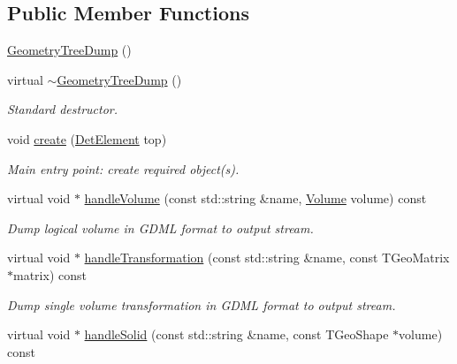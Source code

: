 \subsection*{Public Member Functions}
\begin{DoxyCompactItemize}
\item 
\hyperlink{class_d_d4hep_1_1_geometry_1_1_geometry_tree_dump_a47f8f93072e4f019169b6f7853c4cb77}{GeometryTreeDump} ()
\item 
virtual \hyperlink{class_d_d4hep_1_1_geometry_1_1_geometry_tree_dump_a3d194c9411bf2c915462a3f086d6b8f5}{$\sim$GeometryTreeDump} ()
\begin{DoxyCompactList}\small\item\em Standard destructor. \item\end{DoxyCompactList}\item 
void \hyperlink{class_d_d4hep_1_1_geometry_1_1_geometry_tree_dump_a597ecc457c64cbfdf0fe06301d2d458d}{create} (\hyperlink{class_d_d4hep_1_1_geometry_1_1_det_element}{DetElement} top)
\begin{DoxyCompactList}\small\item\em Main entry point: create required object(s). \item\end{DoxyCompactList}\item 
virtual void $\ast$ \hyperlink{class_d_d4hep_1_1_geometry_1_1_geometry_tree_dump_a630050d539e73e8fbc2893b03b93a75c}{handleVolume} (const std::string \&name, \hyperlink{class_d_d4hep_1_1_geometry_1_1_volume}{Volume} volume) const 
\begin{DoxyCompactList}\small\item\em Dump logical volume in GDML format to output stream. \item\end{DoxyCompactList}\item 
virtual void $\ast$ \hyperlink{class_d_d4hep_1_1_geometry_1_1_geometry_tree_dump_a58968dbc8b29ec78f28b8134df89fe02}{handleTransformation} (const std::string \&name, const TGeoMatrix $\ast$matrix) const 
\begin{DoxyCompactList}\small\item\em Dump single volume transformation in GDML format to output stream. \item\end{DoxyCompactList}\item 
virtual void $\ast$ \hyperlink{class_d_d4hep_1_1_geometry_1_1_geometry_tree_dump_a0efc1c3318733314c21d724b9f944c84}{handleSolid} (const std::string \&name, const TGeoShape $\ast$volume) const 

\end{DoxyCompactItemize}

